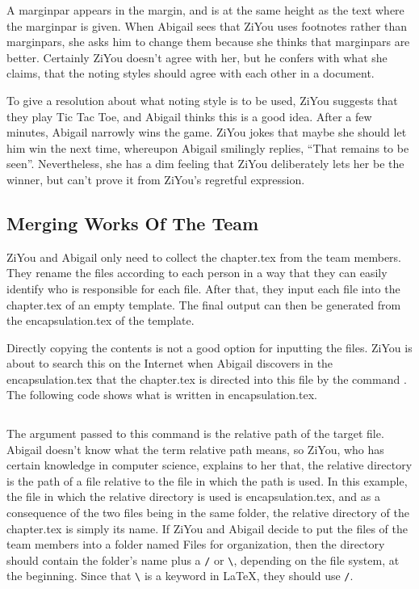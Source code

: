 A marginpar appears in the margin, and is at the same height as the text where the marginpar is given. When Abigail sees that ZiYou uses footnotes rather than marginpars, she asks him to change them because she thinks that marginpars are better. Certainly ZiYou doesn't agree with her, but he confers with what she claims, that the noting styles should agree with each other in a document.

To give a resolution about what noting style is to be used, ZiYou suggests that they play Tic Tac Toe, and Abigail thinks this is a good idea. After a few minutes, Abigail narrowly wins the game. ZiYou jokes that maybe she should let him win the next time, whereupon Abigail smilingly replies, ``That remains to be seen''. Nevertheless, she has a dim feeling that ZiYou deliberately lets her be the winner, but can't prove it from ZiYou's regretful expression.

\subsection{Merging Works Of The Team}
ZiYou and Abigail only need to collect the chapter.tex from the team members. They rename the files according to each person in a way that they can easily identify who is responsible for each file. After that, they input each file into the chapter.tex of an empty template. The final output can then be generated from the encapsulation.tex of the template.

Directly copying the contents is not a good option for inputting the files. ZiYou is about to search this on the Internet when Abigail discovers in the encapsulation.tex that the chapter.tex is directed into this file by the command \verb==. The following code shows what is written in encapsulation.tex.
\begin{lstlisting}

\end{lstlisting}
The argument passed to this command is the relative path of the target file. Abigail doesn't know what the term relative path means, so ZiYou, who has certain knowledge in computer science, explains to her that, the relative directory is the path of a file relative to the file in which the path is used. In this example, the file in which the relative directory is used is encapsulation.tex, and as a consequence of the two files being in the same folder, the relative directory of the chapter.tex is simply its name. If ZiYou and Abigail decide to put the files of the team members into a folder named Files for organization, then the directory should contain the folder's name plus a \verb=/= or \verb=\=, depending on the file system, at the beginning. Since that \verb=\= is a keyword in \LaTeX, they should use \verb=/=.

